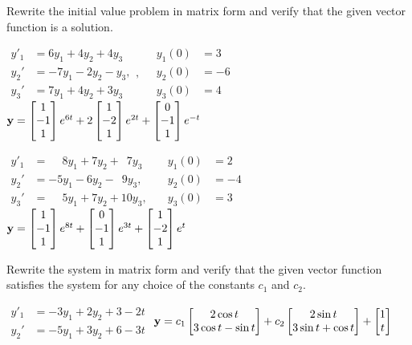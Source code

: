 \begin{exerciselist}
\item\label{exer:10.2.4}Rewrite the initial value problem in matrix form and
 verify that the given vector function is a solution.

\begin{alist}[itemsep=1ex]
\item %
$\begin{aligned}
y'_1&=6y_1 + 4y_2 + 4y_3 \\
y_2'&=-7y_1 -2y_2 - y_3,\\
y_3'&=7y_1 + 4y_2 + 3y_3
\end{aligned},\quad
\begin{aligned}
y_1(0)&=3\\
y_2(0)&=-6\\
y_3(0)&=4
\end{aligned}$
\quad
$\mathbf{y}=\begin{bmatrix}1\\-1\\1\end{bmatrix}e^{6t}+2\begin{bmatrix}1\\-2\\1\end{bmatrix}e^{2t}+\begin{bmatrix}0\\-1\\1\end{bmatrix}e^{-t}$

\item %
$\begin{aligned}
y'_1&=\phantom{-}8y_1 + 7y_2 +\phantom{1}7y_3 \\
y_2'&=-5y_1 -6y_2 -\phantom{1}9y_3,\\
y_3'&=\phantom{-}5y_1 + 7y_2 +10y_3,
\end{aligned}\quad
\begin{aligned}
y_1(0)&=2\\
y_2(0)&=-4\\
y_3(0)&=3\end{aligned}$
\quad
$\mathbf{y}=\begin{bmatrix}1\\-1\\1\end{bmatrix}e^{8t}+\begin{bmatrix}0\\-1\\1\end{bmatrix}e^{3t}+\begin{bmatrix}1\\-2\\1\end{bmatrix}e^t$
\end{alist}

\item\label{exer:10.2.5}Rewrite the system in matrix form and
 verify that the given vector function satisfies the  system for
any choice of the constants $c_1$ and $c_2$.

\begin{alist}[itemsep=1ex]
\item %
$\begin{aligned}
y'_1&=-3y_1+2y_2+3-2t \\
y_2'&=-5y_1+3y_2+6-3t\end{aligned}$
\quad
$\mathbf{y}=c_1\begin{bmatrix}2\cos t\\3\cos t-\sin t\end{bmatrix}
+c_2\begin{bmatrix}2\sin t\\3\sin t+\cos t\end{bmatrix}+\begin{bmatrix}1\\t\end{bmatrix}$


\end{alist}
\end{exerciselist}
